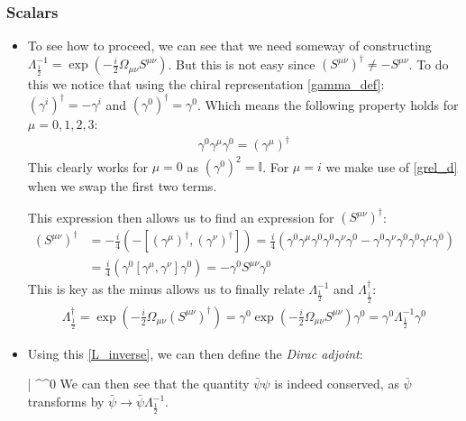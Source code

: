 \documentclass[11pt]{article}
\renewenvironment{flalign}{\vspace{-2mm}\empheq[box=\tcbhighmath]{align}}{\endempheq}
\numberwithin{equation}{section}
\begin{document}
  \subsubsection{Scalars}
  \begin{itemize}
    \item To see how to proceed, we can see that we need someway of constructing $\Lambda^{-1}_{\frac{1}{2}} =  \exp(-\frac{i}{2}\Omega_{\mu\nu}S^{\mu\nu})$. But this is not easy since $(S^{\mu\nu})^{\dagger} \neq - S^{\mu\nu}$. To do this we notice that using the chiral representation \ref{gamma_def}: $(\gamma^{i})^{\dagger} = -\gamma^{i}$ and $(\gamma^{0})^{\dagger} = \gamma^{0}$. Which means the following property holds for $\mu = 0,1,2,3$:
    \begin{align*}
      \gamma^{0}\gamma^{\mu}\gamma^{0} = (\gamma^{\mu})^{\dagger}
    \end{align*}
    This clearly works for $\mu=0$ as $(\gamma^{0})^2= \mathbb{I}$. For $\mu = i$ we make use of \ref{grel_d} when we swap the first two terms. 

    This expression then allows us to find an expression for $(S^{\mu\nu})^{\dagger}$:
    \begin{align*}
      (S^{\mu\nu})^{\dagger} & = -\frac{i}{4}(-[(\gamma^{\mu})^{\dagger},(\gamma^{\nu})^{\dagger}]) = \frac{i}{4}\left(\gamma^{0}\gamma^{\mu}\gamma^{0}\gamma^{0}\gamma^{\nu}\gamma^{0}-\gamma^{0}\gamma^{\nu}\gamma^{0}\gamma^{0}\gamma^{\mu}\gamma^{0}\right) \\
        & = \frac{i}{4}\left(\gamma^{0}[\gamma^{\mu},\gamma^{\nu}]\gamma^{0}\right) = -\gamma^{0}S^{\mu\nu}\gamma^{0}
    \end{align*}
    This is key as the minus allows us to finally relate $\Lambda^{-1}_{\frac{1}{2}}$ and $\Lambda^{\dagger}_{\frac{1}{2}}$:
    \begin{align}
    \label{L_inverse}
       \Lambda^{\dagger}_{\frac{1}{2}} = \exp(-\frac{i}{2}\Omega_{\mu\nu}(S^{\mu\nu})^{\dagger}) = \gamma^{0}\exp(-\frac{i}{2}\Omega_{\mu\nu}S^{\mu\nu})\gamma^{0} = \gamma^{0}\Lambda^{-1}_{\frac{1}{2}}\gamma^{0}
     \end{align} 
     \item Using this \ref{L_inverse}, we can then define the \emph{Dirac adjoint}:

     \begin{flalign}
       \label{adjoint}
        \bar{\psi} \equiv \psi^{\dagger}\gamma^{0} 
     \end{flalign}
     We can then see that the quantity $\bar{\psi}\psi$ is indeed conserved, as $\bar{\psi}$ transforms by $\bar{\psi} \rightarrow \bar{\psi}\Lambda^{-1}_{\frac{1}{2}}$.   
\end{itemize}
\end{document}
